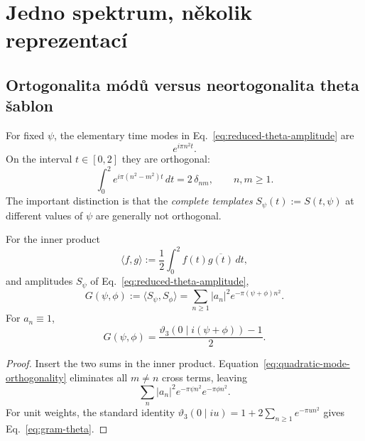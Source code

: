 \section{Jedno spektrum, několik reprezentací}

\subsection{Ortogonalita módů versus neortogonalita theta šablon}

For fixed $\psi$, the elementary time modes in Eq.~\eqref{eq:reduced-theta-amplitude} are
\begin{equation}
  e^{i\pi n^2 t}.
\end{equation}
On the interval $t\in[0,2]$ they are orthogonal:
\begin{equation}
 \int_0^2 e^{i\pi(n^2-m^2)t}\,dt
 = 2\,\delta_{nm},
 \qquad n,m\ge1.
 \label{eq:quadratic-mode-orthogonality}
\end{equation}
The important distinction is that the \emph{complete templates}
$S_\psi(t):=S(t,\psi)$ at different values of $\psi$ are generally not orthogonal.

\begin{theorem}
For the inner product
\begin{equation}
  \langle f,g\rangle:=\frac12\int_0^2 f(t)\overline{g(t)}\,dt,
\end{equation}
and amplitudes $S_\psi$ of Eq.~\eqref{eq:reduced-theta-amplitude},
\begin{equation}
  G(\psi,\phi)
  :=\langle S_\psi,S_\phi\rangle
  =\sum_{n\ge1}|a_n|^2e^{-\pi(\psi+\phi)n^2}.
  \label{eq:gram-general}
\end{equation}
For $a_n\equiv1$,
\begin{equation}
  G(\psi,\phi)
  =\frac{\vartheta_3(0\mid i(\psi+\phi))-1}{2}.
  \label{eq:gram-theta}
\end{equation}
\end{theorem}

\begin{proof}
Insert the two sums in the inner product.  Equation~\eqref{eq:quadratic-mode-orthogonality}
eliminates all $m\neq n$ cross terms, leaving
\[
  \sum_n |a_n|^2 e^{-\pi\psi n^2}e^{-\pi\phi n^2}.
\]
For unit weights, the standard identity
$\vartheta_3(0\mid iu)=1+2\sum_{n\ge1}e^{-\pi u n^2}$ gives
Eq.~\eqref{eq:gram-theta}.
\end{proof}

